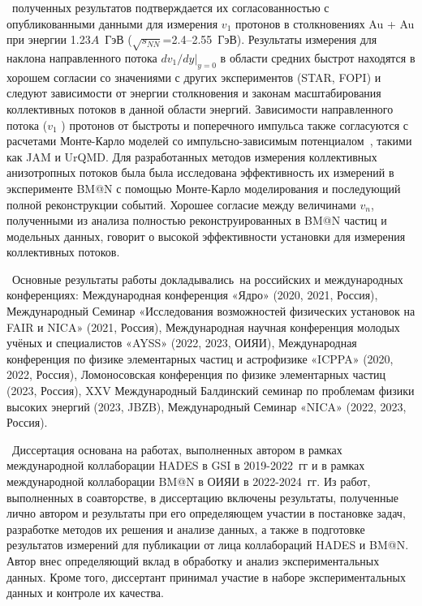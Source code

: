 \reliability\ полученных результатов подтверждается их согласованностью с опубликованными данными для измерения  $v_1$ протонов в столкновениях Au + Au при энергии 1.23$A$~ГэВ ($\sqrt{s_{NN}}$=2.4--2.55~ГэВ). Результаты измерения для наклона направленного потока $dv_1/dy|_{y=0}$ в области средних быстрот находятся в хорошем согласии со значениями с других экспериментов (STAR, FOPI)  и следуют зависимости от энергии столкновения и законам масштабирования коллективных потоков в данной области энергий.
Зависимости направленного потока ($v_1$ ) протонов от быстроты и поперечного импульса также согласуются с расчетами Монте-Карло моделей со импульсно-зависимым потенциалом~\cite{nara2019jam}, такими как JAM и UrQMD.
Для разработанных методов измерения коллективных анизотропных потоков была была исследована эффективность их измерений в эксперименте BM@N с помощью Монте-Карло моделирования и последующий полной реконструкции событий.
Хорошее согласие между величинами  $v_n$,  полученными из анализа полностью реконструированных в BM@N частиц  и модельных данных, говорит о высокой эффективности установки для измерения коллективных потоков.

\probation\
Основные результаты работы докладывались~на российских и международных конференциях: Международная конференция «Ядро» (2020, 2021, Россия), Международный Семинар «Исследования возможностей физических установок на FAIR и NICA» (2021, Россия), 
Международная научная конференция молодых учёных и специалистов «AYSS» (2022, 2023, ОИЯИ), Международная конференция по физике элементарных частиц и астрофизике «ICPPA»
(2020, 2022, Россия), Ломоносовская конференция по 
физике элементарных частиц (2023, Россия), XXV Международный Балдинский семинар по проблемам физики высоких энергий (2023, JBZB), 
Международный Семинар «NICA» (2022, 2023, Россия).

\contribution\ Диссертация основана на работах, выполненных автором в рамках международной коллаборации HADES в GSI в 2019-2022~гг и в рамках международной коллаборации BM@N в ОИЯИ в 2022-2024~гг. Из работ, выполненных в соавторстве, в диссертацию включены результаты, полученные лично автором и результаты при его определяющем участии в постановке задач, разработке методов их решения и анализе данных, а также в подготовке результатов измерений для публикации от лица коллабораций HADES и BM@N.
Автор внес определяющий вклад в обработку и анализ экспериментальных данных.
Кроме того, диссертант принимал участие в наборе экспериментальных данных и контроле их качества.

